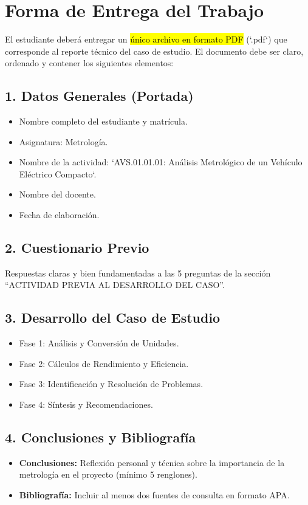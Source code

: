\documentclass{article}
\begin{document}
\hrulefill

\section*{Forma de Entrega del Trabajo}

El estudiante deberá entregar un \hl{único archivo en formato PDF} (`.pdf`) que corresponde al reporte técnico del caso de estudio. El documento debe ser claro, ordenado y contener los siguientes elementos:

\subsection*{1. Datos Generales (Portada)}
\begin{itemize}
    \item Nombre completo del estudiante y matrícula.
    \item Asignatura: Metrología.
    \item Nombre de la actividad: `AVS.01.01.01: Análisis Metrológico de un Vehículo Eléctrico Compacto`.
    \item Nombre del docente.
    \item Fecha de elaboración.
\end{itemize}

\subsection*{2. Cuestionario Previo}
Respuestas claras y bien fundamentadas a las 5 preguntas de la sección ``ACTIVIDAD PREVIA AL DESARROLLO DEL CASO''.

\subsection*{3. Desarrollo del Caso de Estudio}
\begin{itemize}
    \item Fase 1: Análisis y Conversión de Unidades.
    \item Fase 2: Cálculos de Rendimiento y Eficiencia.
    \item Fase 3: Identificación y Resolución de Problemas.
    \item Fase 4: Síntesis y Recomendaciones.
\end{itemize}

\subsection*{4. Conclusiones y Bibliografía}
\begin{itemize}
    \item \textbf{Conclusiones:} Reflexión personal y técnica sobre la importancia de la metrología en el proyecto (mínimo 5 renglones).
    \item \textbf{Bibliografía:} Incluir al menos dos fuentes de consulta en formato APA.
\end{itemize}
\end{document}
